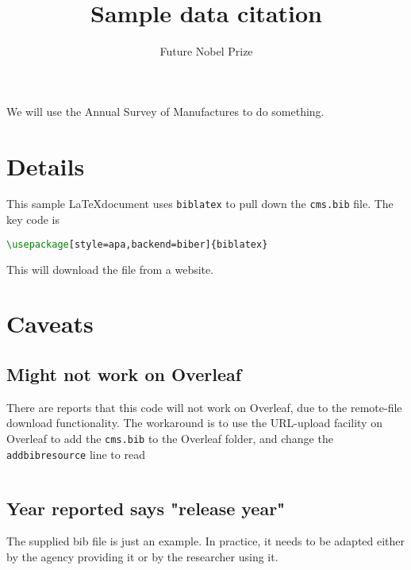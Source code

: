 \documentclass[10pt,letterpaper]{article}
\title{Sample data citation}
\author{Future Nobel Prize}
\begin{document}
\maketitle
We will use the Annual Survey of Manufactures {\color{red} \parencite{cms1}} to do something.

\section{Details}
This sample \LaTeX document uses \texttt{biblatex} to pull down the \texttt{cms.bib} file. The key code is

\begin{lstlisting}[language=TeX]
\usepackage[style=apa,backend=biber]{biblatex}

\end{lstlisting}
This will download the file from a website.

\section{Caveats}
\subsection{Might not work on Overleaf}
There are reports that this code will not work on Overleaf, due to the remote-file download functionality. The workaround is to use the URL-upload facility on Overleaf to add the \texttt{cms.bib} to the Overleaf folder, and change the \texttt{addbibresource} line to read
\begin{lstlisting}

\end{lstlisting}

\subsection{Year reported says "release year"}
The supplied bib file is just an example. In practice, it needs to be adapted either by the agency providing it or by the researcher using it. 

\printbibliography	
\end{document}
